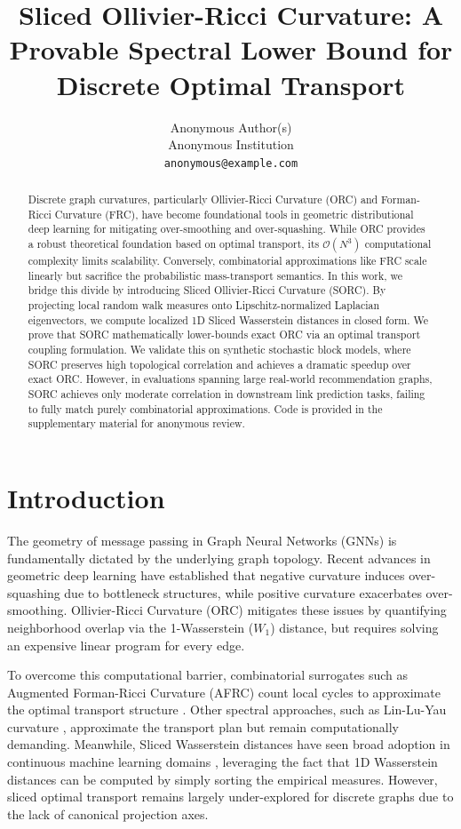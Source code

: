 \documentclass{article}
\title{Sliced Ollivier-Ricci Curvature: A Provable Spectral Lower Bound for Discrete Optimal Transport}
\author{%
  Anonymous Author(s) \\
  Anonymous Institution \\
  \texttt{anonymous@example.com}
}
\begin{document}
\maketitle

\begin{abstract}
Discrete graph curvatures, particularly Ollivier-Ricci Curvature (ORC) and Forman-Ricci Curvature (FRC), have become foundational tools in geometric distributional deep learning for mitigating over-smoothing and over-squashing. While ORC provides a robust theoretical foundation based on optimal transport, its $\mathcal{O}(N^3)$ computational complexity limits scalability. Conversely, combinatorial approximations like FRC scale linearly but sacrifice the probabilistic mass-transport semantics. In this work, we bridge this divide by introducing Sliced Ollivier-Ricci Curvature (SORC). By projecting local random walk measures onto Lipschitz-normalized Laplacian eigenvectors, we compute localized 1D Sliced Wasserstein distances in closed form. We prove that SORC mathematically lower-bounds exact ORC via an optimal transport coupling formulation. We validate this on synthetic stochastic block models, where SORC preserves high topological correlation and achieves a dramatic speedup over exact ORC. However, in evaluations spanning large real-world recommendation graphs, SORC achieves only moderate correlation in downstream link prediction tasks, failing to fully match purely combinatorial approximations. Code is provided in the supplementary material for anonymous review.
\end{abstract}

\section{Introduction}
The geometry of message passing in Graph Neural Networks (GNNs) is fundamentally dictated by the underlying graph topology. Recent advances in geometric deep learning have established that negative curvature induces over-squashing due to bottleneck structures, while positive curvature exacerbates over-smoothing. Ollivier-Ricci Curvature (ORC) mitigates these issues by quantifying neighborhood overlap via the 1-Wasserstein ($W_1$) distance, but requires solving an expensive linear program for every edge. 

To overcome this computational barrier, combinatorial surrogates such as Augmented Forman-Ricci Curvature (AFRC) count local cycles to approximate the optimal transport structure \cite{fesser2023augmented}. Other spectral approaches, such as Lin-Lu-Yau curvature \cite{lin2011ricci}, approximate the transport plan but remain computationally demanding. Meanwhile, Sliced Wasserstein distances have seen broad adoption in continuous machine learning domains \cite{kolouri2019generalized}, leveraging the fact that 1D Wasserstein distances can be computed by simply sorting the empirical measures. However, sliced optimal transport remains largely under-explored for discrete graphs due to the lack of canonical projection axes.
\end{document}
